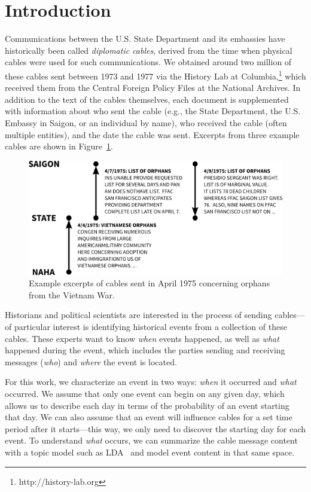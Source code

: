 \section{Introduction}

Communications between the U.S. State Department and its embassies have historically been called \emph{diplomatic cables}, derived from the time when physical cables were used for such communications.
We obtained around two million of these cables sent between 1973 and 1977 via the History Lab at Columbia,\footnote{http://history-lab.org} which received them from the Central Foreign Policy Files at the National Archives.  In addition to the text of the cables themselves, each document is supplemented with information about who sent the cable (e.g., the State Department, the U.S. Embassy in Saigon, or an individual by name), who received the cable (often multiple entities), and the date the cable was sent.
Excerpts from three example cables are shown in Figure~\ref{fig:cables_example}.

\begin{figure}[ht]
\centering
\includegraphics[width=\textwidth]{fig/cables_orphan_example.png}
\caption{Example excerpts of cables sent in April 1975 concerning orphans from the Vietnam War.}
\label{fig:cables_example}
\end{figure}

Historians and political scientists are interested in the process of sending cables---of particular interest is identifying historical events from a collection of these cables.  These experts want to know \emph{when} events happened, as well as \emph{what} happened during the event, which includes the parties sending and receiving messages (\emph{who}) and \emph{where} the event is located. 

For this work, we characterize an event in two ways: \emph{when} it occurred and \emph{what} occurred.  We assume that only one event can begin on any given day, which allows us to describe each day in terms of the probability of an event starting that day.  We can also assume that an event will influence cables for a set time period after it starts---this way, we only need to discover the starting day for each event.  
To understand \emph{what} occurs, we can summarize the cable message content with a topic model such as LDA~\citep{Blei:2003} and model event content in that same space.


